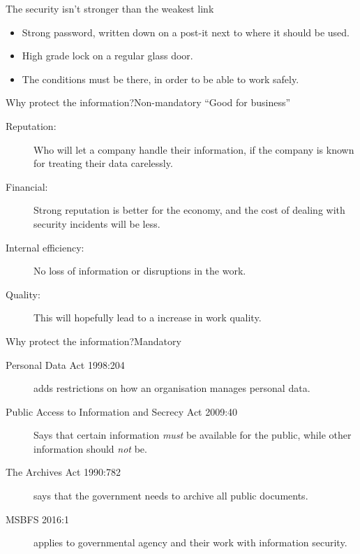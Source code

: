 \documentclass{beamer}
\begin{document}
\begin{frame}{The security isn't stronger than the weakest link}
  \begin{itemize}
    \item Strong password, written down on a post-it next to where it should be
      used.
    \item High grade lock on a regular glass door.
    \item The conditions must be there, in order to be able to work safely.
  \end{itemize}
\end{frame}

\begin{frame}{Why protect the information?}{Non-mandatory}
  \enquote{Good for business}
  \begin{description}
    \item[Reputation:] Who will let a company handle their information, if the
      company is known for treating their data carelessly.

    \item[Financial:] Strong reputation is better for the economy, and the cost
      of dealing with security incidents will be less.

    \item[Internal efficiency:] No loss of information or disruptions in the
      work.

    \item[Quality:] This will hopefully lead to a increase in work quality.

  \end{description}
\end{frame}

\begin{frame}{Why protect the information?}{Mandatory}
  \begin{description}
    \item[Personal Data Act 1998:204] adds restrictions on how an organisation manages
      personal data.

    \item[Public Access to Information and Secrecy Act 2009:40] Says that certain
      information \emph{must} be available for the public, while other information
      should \emph{not} be.

    \item[The Archives Act 1990:782] says that the government needs to archive
      all public documents.

    \item[MSBFS 2016:1] applies to governmental agency and their
      work with information security.

  \end{description}
\end{frame}
\end{document}
